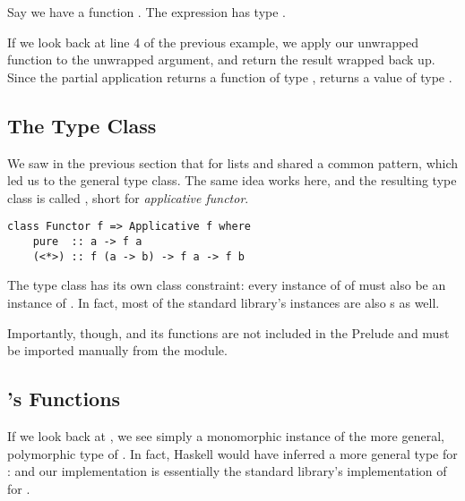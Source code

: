 Say we have a function . The expression  has type .

If we look back at line 4 of the previous example, we apply our unwrapped function to the unwrapped argument, and return the
result wrapped back up. Since the partial application  returns a function of type , 
 returns a value of type . 

\subsection{The  Type Class}

We saw in the previous section that  for lists and  shared a common pattern, which led us to the
general  type class. The same idea works here, and the resulting type class is called , short for
\textit{applicative functor}.

\begin{lstlisting}
class Functor f => Applicative f where
    pure  :: a -> f a
    (<*>) :: f (a -> b) -> f a -> f b
\end{lstlisting}

The  type class has its own class constraint: every instance of  of  must also
be an instance of . In fact, most of the standard library's  instances are also s
as well.

Importantly, though,  and its functions are not included in the Prelude and must be imported manually from
the  module.

\subsection{'s Functions}

If we look back at , we see simply
a monomorphic instance of the more general, polymorphic type of \code{(<*>)}. In fact, Haskell would have inferred a more
general type for :  and our implementation is essentially 
the standard library's implementation of \code{(<*>)} for .

